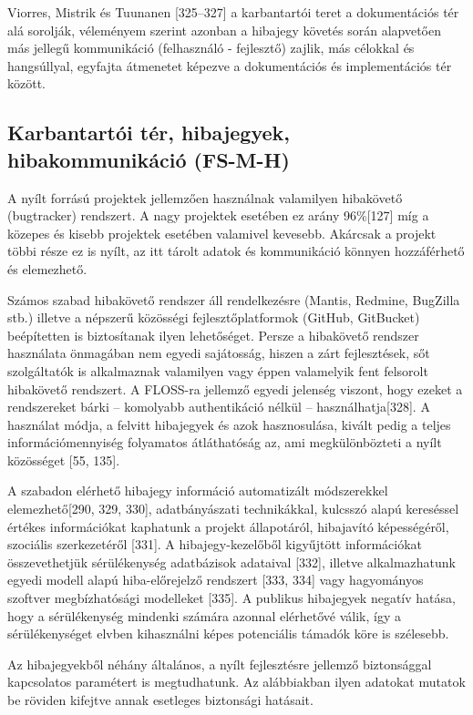 \documentclass[12pt,magyar,a4paper,oneside]{scrreprt}
\begin{document}
Viorres, Mistrik és Tuunanen {[}325--327{]} a karbantartói teret a
dokumentációs tér alá sorolják, véleményem szerint azonban a hibajegy
követés során alapvetően más jellegű kommunikáció (felhasználó -
fejlesztő) zajlik, más célokkal és hangsúllyal, egyfajta átmenetet
képezve a dokumentációs és implementációs tér között.

\hypertarget{sec:FS-M-H}{%
\subsection{Karbantartói tér, hibajegyek, hibakommunikáció
(FS-M-H)}\label{sec:FS-M-H}}

A nyílt forrású projektek jellemzően használnak valamilyen hibakövető
(bugtracker) rendszert. A nagy projektek esetében ez arány 96\%{[}127{]}
míg a közepes és kisebb projektek esetében valamivel kevesebb. Akárcsak
a projekt többi része ez is nyílt, az itt tárolt adatok és kommunikáció
könnyen hozzáférhető és elemezhető.

Számos szabad hibakövető rendszer áll rendelkezésre (Mantis, Redmine,
BugZilla stb.) illetve a népszerű közösségi fejlesztőplatformok (GitHub,
GitBucket) beépítetten is biztosítanak ilyen lehetőséget. Persze a
hibakövető rendszer használata önmagában nem egyedi sajátosság, hiszen a
zárt fejlesztések, sőt szolgáltatók is alkalmaznak valamilyen vagy éppen
valamelyik fent felsorolt hibakövető rendszert. A FLOSS-ra jellemző
egyedi jelenség viszont, hogy ezeket a rendszereket bárki -- komolyabb
authentikáció nélkül -- használhatja{[}328{]}. A használat módja, a
felvitt hibajegyek és azok hasznosulása, kivált pedig a teljes
információmennyiség folyamatos átláthatóság az, ami megkülönbözteti a
nyílt közösséget {[}55, 135{]}.

A szabadon elérhető hibajegy információ automatizált módszerekkel
elemezhető{[}290, 329, 330{]}, adatbányászati technikákkal, kulcsszó
alapú kereséssel értékes információkat kaphatunk a projekt állapotáról,
hibajavító képességéről, szociális szerkezetéről {[}331{]}. A
hibajegy-kezelőből kigyűjtött információkat összevethetjük sérülékenység
adatbázisok adataival {[}332{]}, illetve alkalmazhatunk egyedi modell
alapú hiba-előrejelző rendszert {[}333, 334{]} vagy hagyományos szoftver
megbízhatósági modelleket {[}335{]}. A publikus hibajegyek negatív
hatása, hogy a sérülékenység mindenki számára azonnal elérhetővé válik,
így a sérülékenységet elvben kihasználni képes potenciális támadók köre
is szélesebb.

Az hibajegyekből néhány általános, a nyílt fejlesztésre jellemző
biztonsággal kapcsolatos paramétert is megtudhatunk. Az alábbiakban
ilyen adatokat mutatok be röviden kifejtve annak esetleges biztonsági
hatásait.
\end{document}
